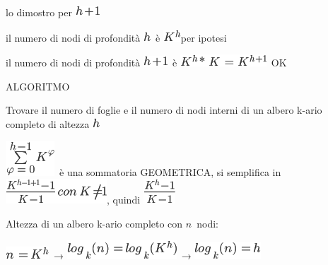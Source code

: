 \documentclass{article}
\begin{document}
{lo dimostro per }\includegraphics{images/image91.png}

{}

{il numero di nodi di profondità
}\includegraphics{images/image89.png}{~è
}\includegraphics{images/image86.png}{per ipotesi}

{il numero di nodi di profondità
}\includegraphics{images/image91.png}{~è
}\includegraphics{images/image92.png}{~OK}

{}

{ALGORITMO}

{Trovare il numero di foglie e il numero di nodi interni di un albero
k-ario completo di altezza }\includegraphics{images/image89.png}{~}

{}

\includegraphics{images/image93.png}{~è una sommatoria GEOMETRICA, si
semplifica in }\includegraphics{images/image94.png}{, quindi
}\includegraphics{images/image95.png}

{}

{Altezza di un albero k-ario completo con
}$n${~nodi:}

\includegraphics{images/image96.png}{~→
}\includegraphics{images/image97.png}{~→
}\includegraphics{images/image98.png}
\end{document}
